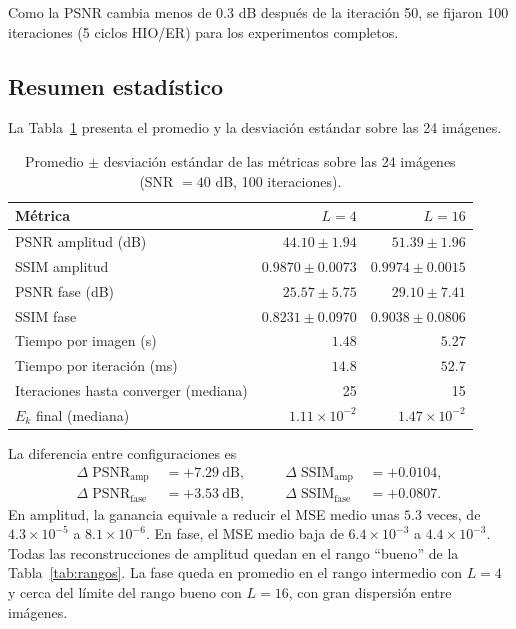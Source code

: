 \documentclass[11pt,a4paper]{article}
\newcommand{\hio}{\textsc{HIO}}
\newcommand{\er}{\textsc{ER}}
\begin{document}
Como la PSNR cambia menos de $0.3$ dB después de la iteración 50, se fijaron 100 iteraciones (5 ciclos \hio{}/\er{}) para los experimentos completos.

\subsection{Resumen estadístico}

La Tabla~\ref{tab:resumen} presenta el promedio y la desviación estándar sobre las 24 imágenes.

\begin{table}[H]
\centering
\caption{Promedio $\pm$ desviación estándar de las métricas sobre las 24 imágenes (SNR $=40$ dB, 100 iteraciones).}
\label{tab:resumen}
\begin{tabular}{lrr}
\toprule
Métrica & $L=4$ & $L=16$ \\
\midrule
PSNR amplitud (dB) & $44.10\pm1.94$ & $51.39\pm1.96$ \\
SSIM amplitud & $0.9870\pm0.0073$ & $0.9974\pm0.0015$ \\
PSNR fase (dB) & $25.57\pm5.75$ & $29.10\pm7.41$ \\
SSIM fase & $0.8231\pm0.0970$ & $0.9038\pm0.0806$ \\
\midrule
Tiempo por imagen (s) & $1.48$ & $5.27$ \\
Tiempo por iteración (ms) & $14.8$ & $52.7$ \\
Iteraciones hasta converger (mediana) & 25 & 15 \\
$E_k$ final (mediana) & $1.11\times10^{-2}$ & $1.47\times10^{-2}$ \\
\bottomrule
\end{tabular}
\end{table}

La diferencia entre configuraciones es
\begin{equation}
 \begin{aligned}
 \Delta\operatorname{PSNR}_\text{amp}&=+7.29\ \mathrm{dB}, &\qquad \Delta\operatorname{SSIM}_\text{amp}&=+0.0104,\\
 \Delta\operatorname{PSNR}_\text{fase}&=+3.53\ \mathrm{dB}, &\qquad \Delta\operatorname{SSIM}_\text{fase}&=+0.0807.
 \end{aligned}
 \label{eq:ganancias}
\end{equation}
En amplitud, la ganancia equivale a reducir el MSE medio unas $5.3$ veces, de $4.3\times10^{-5}$ a $8.1\times10^{-6}$. En fase, el MSE medio baja de $6.4\times10^{-3}$ a $4.4\times10^{-3}$. Todas las reconstrucciones de amplitud quedan en el rango ``bueno'' de la Tabla~\ref{tab:rangos}. La fase queda en promedio en el rango intermedio con $L=4$ y cerca del límite del rango bueno con $L=16$, con gran dispersión entre imágenes.
\end{document}
